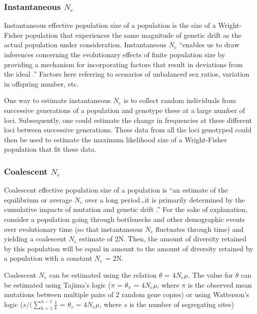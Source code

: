 \documentclass[]{article}
\begin{document}
\subsubsection{Instantaneous $N_e$}\label{instantaneous-nux5fe}

Instantaneous effective population size of a population is the size of a
Wright-Fisher population that experiences the same magnitude of genetic
drift as the actual population under consideration. Instantaneous $N_e$
``enables us to draw inferences concerning the evolutionary effects of
finite population size by providing a mechanism for incorporating
factors that result in deviations from the ideal \cite{hed}.'' Factors
here referring to scenarios of unbalanced sex ratios, variation in
offspring number, etc.

One way to estimate instantaneous $N_e$ is to collect random individuals
from successive generations of a population and genotype these at a
large number of loci. Subsequently, one could estimate the change in
frequencies at these different loci between successive generations.
These data from all the loci genotyped could then be used to estimate
the maximum likelihood size of a Wright-Fisher population that fit these
data.

\subsubsection{Coalescent $N_e$}\label{coalescent-nux5fe}

Coalescent effective population size of a population is ``an estimate of
the equilibrium or average $N_e$ over a long period\ldots{}it is
primarily determined by the cumulative impacts of mutation and genetic
drift \cite{hed}.'' For the sake of explanation, consider a population
going through bottlenecks and other demographic events over evolutionary
time (so that instantaneous $N_e$ fluctuates through time) and yielding
a coalescent $N_e$ estimate of 2N. Then, the amount of diversity
retained by this population will be equal in amount to the amount of
diversity retained by a population with a constant $N_e$ = 2N.

Coalescent $N_e$ can be estimated using the relation $\theta$ =
$4N_{e}\mu$. The value for $\theta$ can be estimated using Tajima's
logic ($\pi$ = $\theta_{\pi}$ = $4N_{e}\mu$, where $\pi$ is the observed
mean mutations between multiple pairs of 2 random gene copies) or using
Watterson's logic ($s/(\sum\limits_{k=1}^{n-1} \frac{1}{k}$ =
$\theta_{s}$ = $4N_{e}\mu$, where $s$ is the number of segregating
sites)
\end{document}
